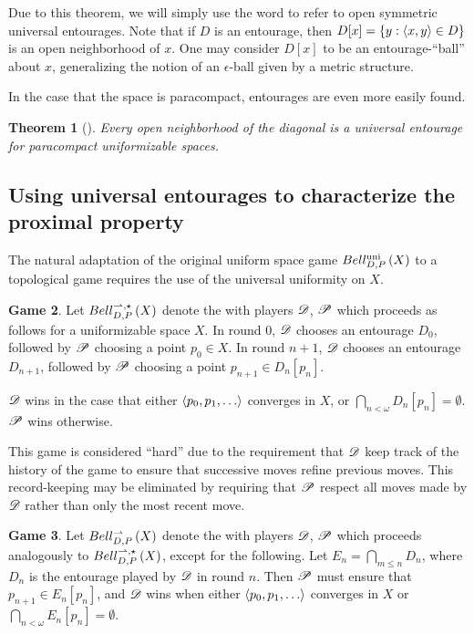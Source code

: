 \documentclass{amsart}
\newtheorem{theorem}{Theorem}[section]
\theoremstyle{definition}
\newtheorem{game}[theorem]{Game}
\begin{document}
  Due to this theorem, we will simply use the word  to refer
  to open symmetric universal entourages. Note that if \(D\) is an
  entourage, then \(D[x]=\{y:\langle x,y\rangle\in D\}\) is an open neighborhood of \(x\).
  One may consider
  \(D[x]\) to be an entourage-``ball'' about \(x\), generalizing the notion of
  an \(\epsilon\)-ball given by a metric structure.

  In the case that
  the space is paracompact, entourages are even more easily found.

  \begin{theorem}[\cite{MR2048350}]
    Every open neighborhood of the diagonal is a universal entourage for
    paracompact uniformizable spaces.
  \end{theorem}

\subsection{Using universal entourages to characterize the proximal property}

  The natural adaptation of the original uniform space game \(Bell_{D,P}^{\textrm{uni}}\left({X}\right)\)
  to a topological game requires the use of the universal uniformity on \(X\).

  \begin{game}
    Let \(Bell_{D,P}^{\rightharpoonup,\star}\left({X}\right)\) denote the  with
    players \(\mathscr{D}\), \(\mathscr{P}\) which proceeds as follows for
    a uniformizable space \(X\). In round \(0\),
    \(\mathscr{D}\) chooses an entourage \(D_0\), followed by \(\mathscr{P}\)
    choosing a point \(p_0\in X\). In round \(n+1\),
    \(\mathscr{D}\) chooses an entourage
    \(D_{n+1}\), followed by \(\mathscr{P}\) choosing a point \(p_{n+1}\in D_n[p_n]\).

    \(\mathscr{D}\) wins in the case that either
    \(\<p_0,p_1,\dots\>\) converges in \(X\),
    or \(\bigcap_{n<\omega}D_n[p_n] = \emptyset\). \(\mathscr{P}\) wins otherwise.
  \end{game}

  This game is considered ``hard'' due to the requirement that \(\mathscr{D}\)
  keep track of the history of the game to ensure that successive
  moves refine previous moves. This record-keeping may be eliminated by
  requiring that \(\mathscr{P}\) respect all moves made by \(\mathscr{D}\) rather than only
  the most recent move.

  \begin{game}
    Let \(Bell_{D,P}^{\rightharpoonup}\left({X}\right)\) denote the  with players
    \(\mathscr{D}\), \(\mathscr{P}\) which proceeds analogously to \(Bell_{D,P}^{\rightharpoonup,\star}\left({X}\right)\),
    except for the following. Let \(E_n=\bigcap_{m\leq n}D_n\), where \(D_n\) is
    the entourage played by \(\mathscr{D}\) in round \(n\).
    Then \(\mathscr{P}\) must ensure that \(p_{n+1}\in E_n[p_n]\),
    and \(\mathscr{D}\) wins when either \(\<p_0,p_1,\dots\>\) converges in \(X\)
    or \(\bigcap_{n<\omega}E_n[p_n] = \emptyset\).
  \end{game}
\end{document}
